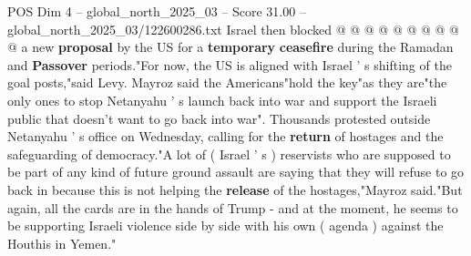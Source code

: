 \begin{textsample}{POS Dim 4 – global\_north\_2025\_03 – Score 31.00 – global\_north\_2025\_03/122600286.txt}
Israel then blocked @ @ @ @ @ @ @ @ @ @ a new \textbf{proposal} by the US for a \textbf{temporary} \textbf{ceasefire} during the Ramadan and \textbf{Passover} periods."For now, the US is aligned with Israel ' s shifting of the goal posts,"said Levy.
Mayroz said the Americans"hold the key"as they are"the only ones to stop Netanyahu ' s launch back into war and support the Israeli public that doesn't want to go back into war".
Thousands protested outside Netanyahu ' s office on Wednesday, calling for the \textbf{return} of hostages and the safeguarding of democracy."A lot of ( Israel ' s ) reservists who are supposed to be part of any kind of future ground assault are saying that they will refuse to go back in because this is not helping the \textbf{release} of the hostages,"Mayroz said."But again, all the cards are in the hands of Trump - and at the moment, he seems to be supporting Israeli violence side by side with his own ( agenda ) against the Houthis in Yemen."

\end{textsample}
